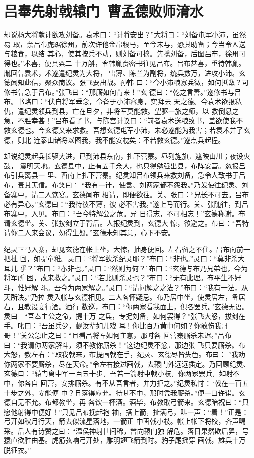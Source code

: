 \chapter{吕奉先射戟辕门~曹孟德败师淯水}

却说杨大将献计欲攻刘备。袁术曰：“计将安出？”大将曰：“刘备屯军小沛，虽然易
取，奈吕布虎踞徐州，前次许他金帛粮马，至今未与，恐其助备；今当令人送与粮食，以结
其心，使其按兵不动，则刘备可擒。先擒刘备，后图吕布，徐州可得也。”术喜，便具粟二
十万斛，令韩胤赍密书往见吕布。吕布甚喜，重待韩胤。胤回告袁术，术遂遣纪灵为大将，
雷薄、陈兰为副将，统兵数万，进攻小沛。玄德闻知此信，聚众商议。张飞要出战。孙韩
曰：“今小沛粮寡兵微，如何抵敌？可修书告急于吕布。”张飞曰：“那厮如何肯来！”玄
德曰：“乾之言善。”遂修书与吕布。书略曰：“伏自将军垂念，令备于小沛容身，实拜云
天之德。今袁术欲报私仇，遣纪灵领兵到县，亡在旦夕，非将军莫能救。望驱一旅之师，以
救倒悬之急，不胜幸甚！”吕布看了书，与陈宫计议曰：“前者袁术送粮致书，盖欲使我不
救玄德也。今玄德又来求救。吾想玄德屯军小沛，未必遂能为我害；若袁术并了玄德，则北
连泰山诸将以图我，我不能安枕矣：不若救玄德。”遂点兵起程。

却说纪灵起兵长驱大进，已到沛县东南，扎下营寨。昼列旌旗，遮映山川；夜设火鼓，
震明天地。玄德县中，止有五千余人，也只得勉强出县，布阵安营。忽报吕布引兵离县一
里、西南上扎下营寨。纪灵知吕布领兵来救刘备，急令人致书于吕布，责其无信。布笑曰：
“我有一计，使袁、刘两家都不怨我。”乃发使往纪灵、刘备寨中，请二人饮宴。玄德闻布
相请，即便欲往。关、张曰：“兄长不可去。吕布必有异心。”玄德曰：“我待彼不薄，彼
必不害我。”遂上马而行。关、张随往，到吕布寨中，入见。布曰：“吾今特解公之危。异
日得志，不可相忘！”玄德称谢。布请玄德坐。关、张按剑立于背后。人报纪灵到，玄德大
惊，欲避之。布曰：“吾特请你二人来会议，勿得生疑。”玄德未知其意，心下不安。

纪灵下马入寨，却见玄德在帐上坐，大惊，抽身便回。左右留之不住。吕布向前一把扯
回，如提童稚。灵曰：“将军欲杀纪灵耶？”布曰：“非也。”灵曰：“莫非杀大耳儿
乎？”布曰：“亦非也。”灵曰：“然则为何？”布曰：“玄德与布乃兄弟也，今为将军所
困，故来救之。”灵曰：“若此则杀灵也？”布曰：“无有此理。布平生不好斗，惟好解
斗。吾今为两家解之。”灵曰：“请问解之之法？”布曰：“我有一法，从天所决。”乃拉
灵入帐与玄德相见。二人各怀疑忌。布乃居中坐，使灵居左，备居右，且教设宴行酒。酒行
数巡，布曰：“你两家看我面上，俱各罢兵。”玄德无语。灵曰：“吾奉主公之命，提十万
之兵，专捉刘备，如何罢得？”张飞大怒，拔剑在手。叱曰：“吾虽兵少，觑汝辈如儿戏
耳！你比百万黄巾何如？你敢伤我哥哥！”关公急止之曰：“且看吕将军如何主意，那时各
回营寨厮杀未迟。”吕布曰：“我请你两家解斗，须不教你厮杀！”这边纪灵不忿，那边张
飞只要厮杀。布大怒，教左右：“取我戟来，布提画戟在手，纪灵、玄德尽皆失色。布曰：
“我劝你两家不要厮杀，尽在天命。”令左右接过画戟，去辕门外远远插定。乃回顾纪灵、
玄德曰：“辕门离中军一百五十步，吾若一箭射中戟小枝，你两家罢兵，如射不中，你各自
回营，安排厮杀。有不从吾言者，并力拒之。”纪灵私忖：“戟在一百五十步之外，安能便
中？且落得应允。待其不中，那时凭我厮杀。”便一口许诺。玄德自无不允。布都教坐，再
各饮一杯酒。酒毕，布教取弓箭来。玄德暗祝曰：“只愿他射得中便好！”只见吕布挽起袍
袖，搭上箭，扯满弓，叫一声：“着！”正是：弓开如秋月行天，箭去似流星落地，一箭正
中画戟小枝。帐上帐下将校，齐声喝采。后人有诗赞之曰：“温侯神射世间稀，曾向辕门独
解危。落日果然欺后羿，号猿直欲胜由基。虎筋弦响弓开处，雕羽翅飞箭到时。豹子尾摇穿
画戟，雄兵十万脱征衣。”

